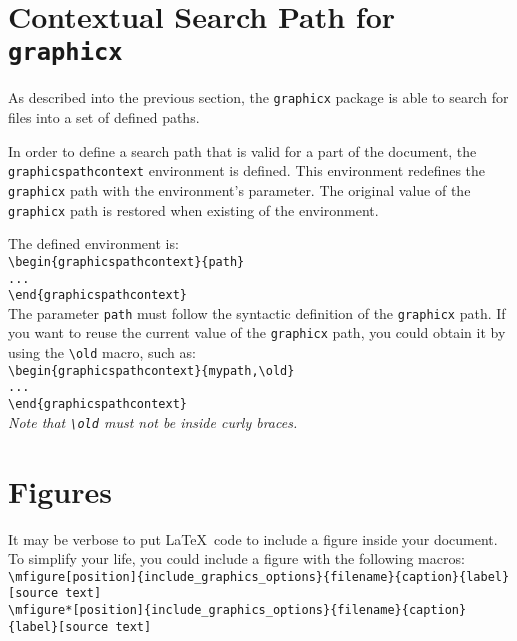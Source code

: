 \documentclass[book,taskpackage,specpackage,codepackage]{upmethodology-document}
\begin{document}
\section{Contextual Search Path for \texttt{graphicx}}

As described into the previous section, the \texttt{graphicx} package is able to search for files into a set of defined paths.

In order to define a search path that is valid for a part of the document, the \texttt{graphicspathcontext} environment is defined. This environment redefines the \texttt{graphicx} path with the environment's parameter. The original value of the \texttt{graphicx} path is restored when existing of the environment.

The defined environment is: \\
\texttt{{\textbackslash}begin\{graphicspathcontext\}\{path\}} \\
\texttt{...}\\
\texttt{{\textbackslash}end\{graphicspathcontext\}} \\


The parameter \texttt{path} must follow the syntactic definition of the \texttt{graphicx} path. If you want to reuse the current value of the \texttt{graphicx} path, you could obtain it by using the \texttt{{\textbackslash}old} macro, such as: \\
\texttt{{\textbackslash}begin\{graphicspathcontext\}\{{mypath},{\textbackslash}old\}} \\
\texttt{...}\\
\texttt{{\textbackslash}end\{graphicspathcontext\}} \\

\emph{Note that \texttt{{\textbackslash}old} must not be inside curly braces.}


\section{Figures}

It may be verbose to put \LaTeX\ code to include a figure inside your document. To simplify your life, you could include a figure with the following macros: \\
\texttt{{\textbackslash}mfigure[position]\{include\_graphics\_options\}\{filename\}\{caption\}\{label\}[source text]} \\
\texttt{{\textbackslash}mfigure*[position]\{include\_graphics\_options\}\{filename\}\{caption\}\{label\}[source text]} \\
\end{document}
